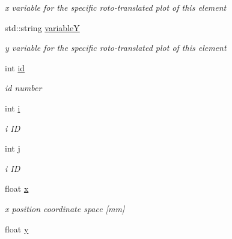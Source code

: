 \begin{DoxyCompactItemize}
\begin{DoxyCompactList}\small\item\em x variable for the specific roto-\/translated plot of this element \end{DoxyCompactList}\item 
\hypertarget{classElement_ad34ac2c8cf07782f878b2ae48f69c4c4}{std\+::string \hyperlink{classElement_ad34ac2c8cf07782f878b2ae48f69c4c4}{variable\+Y}}\label{classElement_ad34ac2c8cf07782f878b2ae48f69c4c4}

\begin{DoxyCompactList}\small\item\em y variable for the specific roto-\/translated plot of this element \end{DoxyCompactList}\item 
\hypertarget{classElement_a3bd136c994cd7b24a62cb464f78990ad}{int \hyperlink{classElement_a3bd136c994cd7b24a62cb464f78990ad}{id}}\label{classElement_a3bd136c994cd7b24a62cb464f78990ad}

\begin{DoxyCompactList}\small\item\em id number \end{DoxyCompactList}\item 
\hypertarget{classElement_ae973e652f252c0d41cf2f251c07fcf30}{int \hyperlink{classElement_ae973e652f252c0d41cf2f251c07fcf30}{i}}\label{classElement_ae973e652f252c0d41cf2f251c07fcf30}

\begin{DoxyCompactList}\small\item\em i I\+D \end{DoxyCompactList}\item 
\hypertarget{classElement_afc114c80c73d8264637ab15b022a6ad2}{int \hyperlink{classElement_afc114c80c73d8264637ab15b022a6ad2}{j}}\label{classElement_afc114c80c73d8264637ab15b022a6ad2}

\begin{DoxyCompactList}\small\item\em i I\+D \end{DoxyCompactList}\item 
\hypertarget{classElement_a32de6866d49c3cd4634f290fde2280d3}{float \hyperlink{classElement_a32de6866d49c3cd4634f290fde2280d3}{x}}\label{classElement_a32de6866d49c3cd4634f290fde2280d3}

\begin{DoxyCompactList}\small\item\em x position coordinate space \mbox{[}mm\mbox{]} \end{DoxyCompactList}\item 
\hypertarget{classElement_a39fa54b6d5c56d067748a8e13f0be851}{float \hyperlink{classElement_a39fa54b6d5c56d067748a8e13f0be851}{y}}\label{classElement_a39fa54b6d5c56d067748a8e13f0be851}


\end{DoxyCompactItemize}
